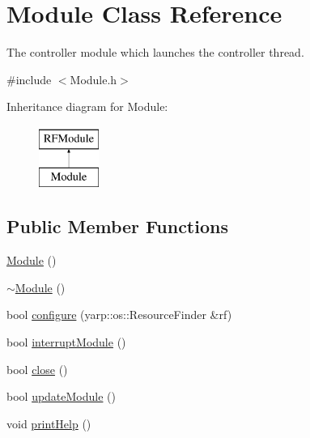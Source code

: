 \hypertarget{classModule}{}\section{Module Class Reference}
\label{classModule}


The controller module which launches the controller thread.  




{\ttfamily \#include $<$Module.\+h$>$}

Inheritance diagram for Module\+:\begin{figure}[H]
\begin{center}
\leavevmode
\includegraphics[height=2.000000cm]{classModule}
\end{center}
\end{figure}
\subsection*{Public Member Functions}
\begin{DoxyCompactItemize}
\item 
\hyperlink{classModule_a5a240a8a9ab1813b17bcb810b24ceaea}{Module} ()
\item 
\hyperlink{classModule_a7c9d9c096786d127590fdd8aa2b7d681}{$\sim$\+Module} ()
\item 
bool \hyperlink{classModule_a1f18c762538086e1304ea18e00e51abb}{configure} (yarp\+::os\+::\+Resource\+Finder \&rf)
\item 
bool \hyperlink{classModule_ad53295be6c51e834eec92009c2d7bbf3}{interrupt\+Module} ()
\item 
bool \hyperlink{classModule_ab07583e4393148dfe0fd2ae6e7998a4b}{close} ()
\item 
bool \hyperlink{classModule_a1b1c4963512941537cef766217329a8a}{update\+Module} ()
\item 
void \hyperlink{classModule_a861f70d79b8f36dccf5daae182763bd8}{print\+Help} ()
\end{DoxyCompactItemize}
